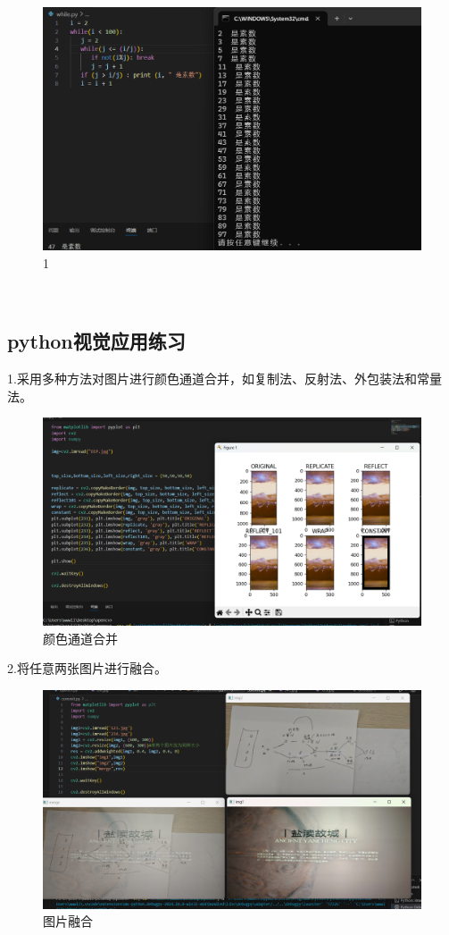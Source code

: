\documentclass[a4paper, 12pt]{article}
\begin{document}
\begin{figure}[H]
  \centering
  \includegraphics[width=1\textwidth]{屏幕截图 2024-09-06 145233.png}
  \caption{1}
    \end{figure}
\\
\subsection{python视觉应用练习}

\noindent 1.采用多种方法对图片进行颜色通道合并，如复制法、反射法、外包装法和常量法。
\begin{figure}[H]
  \centering
  \includegraphics[width=1\textwidth]{屏幕截图 2024-09-12 171721.png}
  \caption{颜色通道合并}
    \end{figure}

2.将任意两张图片进行融合。
\begin{figure}[H]
  \centering
  \includegraphics[width=1\textwidth]{屏幕截图 2024-09-12 191350.png}
  \caption{图片融合}
    \end{figure}
\end{document}

